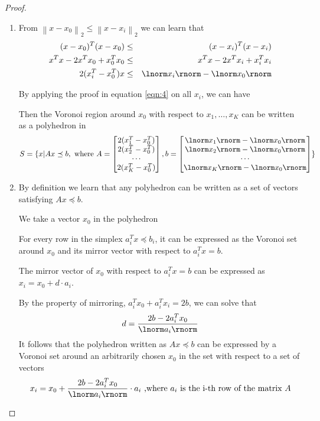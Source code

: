 \begin{proof}
\begin{enumerate}
\item{
From $\left\|x-x_{0}\right\|_{2} \leq\left\|x-x_{i}\right\|_{2}$ we can learn that
\begin{equation}
\begin{aligned}
(x-x_0)^T(x-x_0) &\leq& (x - x_i)^T(x-x_i)\\
x^T x - 2 x^T x_0 + x_0^T x_0 &\leq&  x^T x - 2 x^T x_i + x_i^T x_i \\
2(x_i^T - x_0^T)x &\leq& \lnorm x_i \rnorm - \lnorm x_0 \rnorm
\end{aligned}
\label{eqn:4}
\end{equation}

By applying the proof in equation \ref{eqn:4} on all $x_i$, we can have


Then the Voronoi region around $x_0$ with respect to $x_{1}, \ldots, x_{K}$ can be written as a polyhedron in $$S = \{x | Ax \preceq b, \text{ where } A = \begin{bmatrix}
2(x_1^T - x_0^T) \\
2(x_2^T - x_0^T) \\
\cdots \\
2(x_K^T - x_0^T)
\end{bmatrix}
, b = \begin{bmatrix}
\lnorm x_1 \rnorm - \lnorm x_0 \rnorm \\
\lnorm x_2 \rnorm - \lnorm x_0 \rnorm \\
\cdots \\
\lnorm x_K \rnorm - \lnorm x_0 \rnorm \\
\end{bmatrix} \}  $$
}

\item{
By definition we learn that any polyhedron can be written as a set of vectors satisfying $Ax \preceq b$.

We take a vector $x_0$ in the polyhedron

For every row in the simplex $a_i^T x \preceq b_i$, it can be expressed as the Voronoi set around $x_0$ and its mirror vector with respect to $a_i^T x = b$. 

The mirror vector of $x_0$ with respect to $a_i^T x = b$ can be expressed as $x_i = x_0 + d \cdot a_i$.

By the property of mirroring, $a_i^T x_0 + a_i^T x_i = 2b $, we can solve that $$d = \frac{2b-2a_i^T x_0}{\lnorm a_i \rnorm}$$
It follows that the polyhedron written as $Ax \preceq b$ can be expressed by a Voronoi set around an arbitrarily chosen $x_0$ in the set with respect to a set of vectors $$x_i = x_0 + \frac{2b-2a_i^T x_0}{\lnorm a_i \rnorm} \cdot a_i \text{ ,where } a_i \text{ is the i-th row of the matrix } A$$
}

\end{enumerate}
\end{proof}

